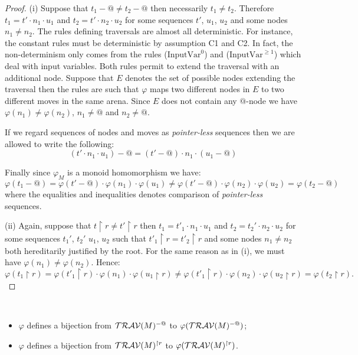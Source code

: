 \begin{proof}
(i) Suppose that $t_1-@\neq t_2-@$ then necessarily $t_1 \neq t_2$. Therefore
 $t_1 = t' \cdot n_1 \cdot u_1$ and $t_2 = t' \cdot n_2 \cdot u_2$ for some sequences $t'$, $u_1$, $u_2$
and some nodes $n_1\neq n_2$.
The rules defining traversals are almost all deterministic. For instance, the constant rules must be deterministic by assumption C1 and C2.
In fact, the non-determinism only comes from the rules
($\mbox{InputVar}^0$) and ($\mbox{InputVar}^{\geq 1}$) which deal with input variables. Both rules permit to extend the traversal
with an additional node. Suppose that $E$ denotes the set of possible nodes extending the traversal then the rules are such that
$\varphi$ maps two different nodes in $E$ to two different moves in the same arena. Since $E$ does not contain any $@$-node we have
$\varphi(n_1) \neq \varphi(n_2)$, $n_1 \neq @$ and $n_2 \neq @$.

If we regard sequences of nodes and moves as \emph{pointer-less} sequences then we are allowed to write the following:
$$ (t' \cdot n_1 \cdot u_1) - @ = (t' - @) \cdot n_1 \cdot (u_1 -@)$$

Finally since $\varphi_M$ is a monoid homomorphism we have:
$$ \varphi(t_1-@) = \varphi(t'-@) \cdot \varphi(n_1) \cdot \varphi(u_1) \neq \varphi(t'-@) \cdot \varphi(n_2) \cdot \varphi(u_2) = \varphi(t_2-@) $$
where the equalities and inequalities denotes comparison of \emph{pointer-less} sequences.

(ii) Again, suppose that $t \upharpoonright r \neq t' \upharpoonright r$ then
 $t_1 = t'_1 \cdot n_1 \cdot u_1$ and $t_2 = t_2' \cdot n_2 \cdot u_2$ for some sequences $t_1'$, $t_2'$ $u_1$, $u_2$
 such that $t'_1 \upharpoonright r = t'_2 \upharpoonright r $
and some nodes $n_1 \neq n_2$ both hereditarily justified by the root.
For the same reason as in (i), we must have $\varphi(n_1) \neq \varphi(n_2)$. Hence:
$$ \varphi(t_1\upharpoonright r) =
        \varphi(t'_1\upharpoonright r) \cdot \varphi(n_1) \cdot \varphi(u_1 \upharpoonright r)
    \neq \varphi(t'_1\upharpoonright r) \cdot \varphi(n_2) \cdot \varphi(u_2 \upharpoonright r)
         = \varphi(t_2\upharpoonright r).$$
\end{proof}

\begin{cor} \
\label{cor:varphi_bij}
\begin{itemize}
\item[(i)] $\varphi$ defines a bijection from $\mathcal{TRAV}(M)^{-@}$
to $\varphi(\mathcal{TRAV}(M)^{-@})$;
\item[(ii)] $\varphi$ defines a bijection from $\mathcal{TRAV}(M)^{\upharpoonright r}$ to
$\varphi(\mathcal{TRAV}(M)^{\upharpoonright r})$.
\end{itemize}
\end{cor}

